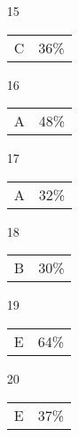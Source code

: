 \documentclass[12pt]{article}
\begin{document}
\begin{multicols}{5}
\begin{enumerate}
\item[15] \begin{tabular}{cc} C & 36\%\end{tabular}
\item[]
\item[16] \begin{tabular}{cc} A & 48\%\end{tabular}
\item[17] \begin{tabular}{cc} A & 32\%\end{tabular}
\item[18] \begin{tabular}{cc} B & 30\%\end{tabular}
\item[19] \begin{tabular}{cc} E & 64\%\end{tabular}
\item[20] \begin{tabular}{cc} E & 37\%\end{tabular}

\item[]


\end{enumerate}
\end{multicols}
\end{document}
